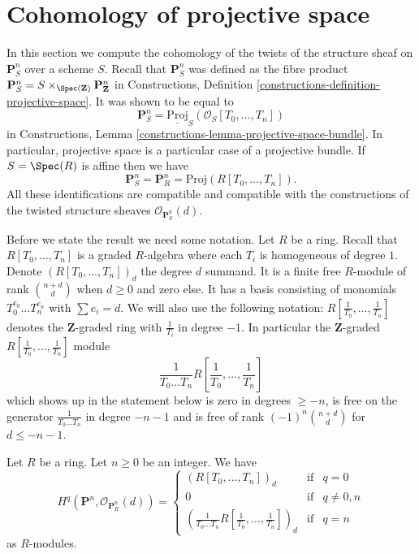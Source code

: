 \section{Cohomology of projective space}
\label{section-cohomology-projective-space}

\noindent
In this section we compute the cohomology of the twists of the
structure sheaf on $\mathbf{P}^n_S$ over a scheme $S$.
Recall that $\mathbf{P}^n_S$ was defined as the fibre product
$
\mathbf{P}^n_S = S \times_{\Spec(\mathbf{Z})} \mathbf{P}^n_{\mathbf{Z}}
$
in Constructions, Definition \ref{constructions-definition-projective-space}.
It was shown to be equal to
$$
\mathbf{P}^n_S = \underline{\text{Proj}}_S(\mathcal{O}_S[T_0, \ldots, T_n])
$$
in Constructions, Lemma \ref{constructions-lemma-projective-space-bundle}.
In particular, projective space is a particular case of a projective bundle.
If $S = \Spec(R)$ is affine then we have
$$
\mathbf{P}^n_S = \mathbf{P}^n_R = \text{Proj}(R[T_0, \ldots, T_n]).
$$
All these identifications are compatible and compatible with the constructions
of the twisted structure sheaves $\mathcal{O}_{\mathbf{P}^n_S}(d)$.

\medskip\noindent
Before we state the result we need some notation.
Let $R$ be a ring.
Recall that $R[T_0, \ldots, T_n]$ is a graded
$R$-algebra where each $T_i$ is homogeneous of degree $1$.
Denote $(R[T_0, \ldots, T_n])_d$ the degree $d$ summand.
It is a finite free $R$-module of rank $\binom{n + d}{d}$
when $d \geq 0$ and zero else.
It has a basis consisting of monomials $T_0^{e_0} \ldots T_n^{e_n}$
with $\sum e_i = d$. We will also use the following notation:
$R[\frac{1}{T_0}, \ldots, \frac{1}{T_n}]$ denotes the $\mathbf{Z}$-graded
ring with $\frac{1}{T_i}$ in degree $-1$. In particular the
$\mathbf{Z}$-graded $R[\frac{1}{T_0}, \ldots, \frac{1}{T_n}]$ module
$$
\frac{1}{T_0 \ldots T_n} R[\frac{1}{T_0}, \ldots, \frac{1}{T_n}]
$$
which shows up in the statement below is zero in degrees
$\geq -n$, is free on the generator $\frac{1}{T_0 \ldots T_n}$
in degree $-n - 1$ and is free of rank $(-1)^n\binom{n + d}{d}$ for
$d \leq -n - 1$.

\begin{lemma}
\label{lemma-cohomology-projective-space-over-ring}
Let $R$ be a ring.
Let $n \geq 0$ be an integer.
We have
$$
H^q(\mathbf{P}^n, \mathcal{O}_{\mathbf{P}^n_R}(d)) =
\left\{
\begin{matrix}
(R[T_0, \ldots, T_n])_d & \text{if} & q = 0 \\
0 & \text{if} & q \not = 0, n \\
\left(\frac{1}{T_0 \ldots T_n} R[\frac{1}{T_0}, \ldots, \frac{1}{T_n}]\right)_d
& \text{if} & q = n
\end{matrix}
\right.
$$
as $R$-modules.
\end{lemma}

